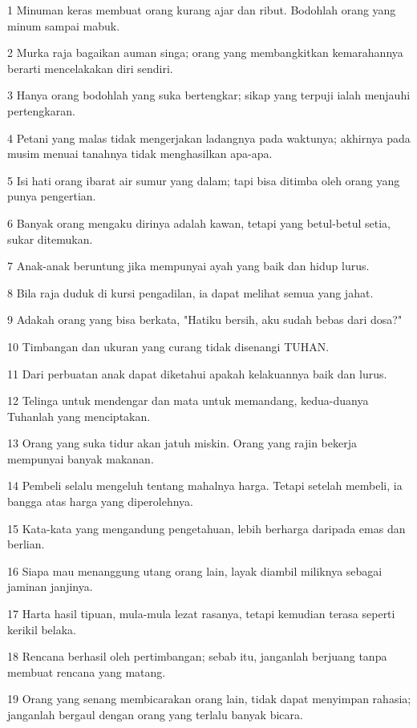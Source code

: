 \par 1 Minuman keras membuat orang kurang ajar dan ribut. Bodohlah orang yang minum sampai mabuk.
\par 2 Murka raja bagaikan auman singa; orang yang membangkitkan kemarahannya berarti mencelakakan diri sendiri.
\par 3 Hanya orang bodohlah yang suka bertengkar; sikap yang terpuji ialah menjauhi pertengkaran.
\par 4 Petani yang malas tidak mengerjakan ladangnya pada waktunya; akhirnya pada musim menuai tanahnya tidak menghasilkan apa-apa.
\par 5 Isi hati orang ibarat air sumur yang dalam; tapi bisa ditimba oleh orang yang punya pengertian.
\par 6 Banyak orang mengaku dirinya adalah kawan, tetapi yang betul-betul setia, sukar ditemukan.
\par 7 Anak-anak beruntung jika mempunyai ayah yang baik dan hidup lurus.
\par 8 Bila raja duduk di kursi pengadilan, ia dapat melihat semua yang jahat.
\par 9 Adakah orang yang bisa berkata, "Hatiku bersih, aku sudah bebas dari dosa?"
\par 10 Timbangan dan ukuran yang curang tidak disenangi TUHAN.
\par 11 Dari perbuatan anak dapat diketahui apakah kelakuannya baik dan lurus.
\par 12 Telinga untuk mendengar dan mata untuk memandang, kedua-duanya Tuhanlah yang menciptakan.
\par 13 Orang yang suka tidur akan jatuh miskin. Orang yang rajin bekerja mempunyai banyak makanan.
\par 14 Pembeli selalu mengeluh tentang mahalnya harga. Tetapi setelah membeli, ia bangga atas harga yang diperolehnya.
\par 15 Kata-kata yang mengandung pengetahuan, lebih berharga daripada emas dan berlian.
\par 16 Siapa mau menanggung utang orang lain, layak diambil miliknya sebagai jaminan janjinya.
\par 17 Harta hasil tipuan, mula-mula lezat rasanya, tetapi kemudian terasa seperti kerikil belaka.
\par 18 Rencana berhasil oleh pertimbangan; sebab itu, janganlah berjuang tanpa membuat rencana yang matang.
\par 19 Orang yang senang membicarakan orang lain, tidak dapat menyimpan rahasia; janganlah bergaul dengan orang yang terlalu banyak bicara.
